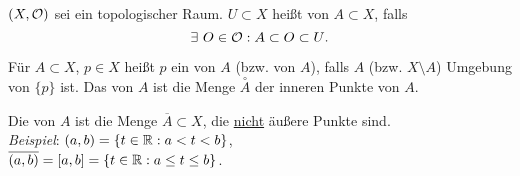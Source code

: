 \begin{definition}[Umgebung]\label{def:umgebung}
  \( (X, \mathcal{O}) \) sei ein topologischer Raum. \( U \subset X \) heißt  von \( A \subset X \), falls
  \begin{equation*}
    \exists \ O \in \mathcal{O} : A \subset O \subset U\text{.}
  \end{equation*}
\end{definition}

\begin{definition}\label{def:innereraeussererpunkt}
  Für \( A \subset X \), \( p \in X \) heißt \( p \) ein  von \( A \) (bzw.  von \( A \)), falls \( A \) (bzw. \( X \setminus A \)) Umgebung von \( \{ p \} \) ist. Das  von \( A \) ist die Menge \( \overset{\circ}{A} \) der inneren Punkte von \( A \).
\end{definition}

\begin{definition}
  Die  von \( A \) ist die Menge \( \overline{A} \subset X \), die \underline{nicht} äußere Punkte sind. \\
  \emph{Beispiel}: \( (a, b) = \{ t \in \mathbb{R} : a < t < b \} \), \\ \( \overline{(a,b)} = [a,b] = \{ t \in \mathbb{R} : a \leq t \leq b \} \).
\end{definition}

